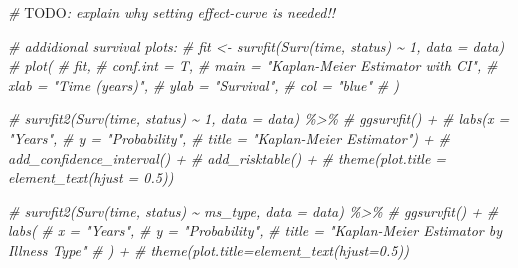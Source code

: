\documentclass[
]{article}
\newenvironment{Shaded}{\begin{snugshade}}{\end{snugshade}}
\newcommand{\AlertTok}[1]{\textcolor[rgb]{0.94,0.16,0.16}{#1}}
\newcommand{\CommentTok}[1]{\textcolor[rgb]{0.56,0.35,0.01}{\textit{#1}}}
\begin{document}
\begin{Shaded}
\begin{Highlighting}[]
\CommentTok{\# }\AlertTok{TODO}\CommentTok{: explain why setting effect{-}curve is needed!!}
\end{Highlighting}
\end{Shaded}

\begin{Shaded}
\begin{Highlighting}[]
\CommentTok{\# addidional survival plots:}
\CommentTok{\# fit \textless{}{-} survfit(Surv(time, status) \textasciitilde{} 1, data = data)}
\CommentTok{\# plot(}
\CommentTok{\#   fit,}
\CommentTok{\#   conf.int = T,}
\CommentTok{\#   main = "Kaplan{-}Meier Estimator with CI",}
\CommentTok{\#   xlab = "Time (years)",}
\CommentTok{\#   ylab = "Survival",}
\CommentTok{\#   col = "blue"}
\CommentTok{\# )}

\CommentTok{\# survfit2(Surv(time, status) \textasciitilde{} 1, data = data) \%\textgreater{}\%}
\CommentTok{\#   ggsurvfit() +}
\CommentTok{\#   labs(x = "Years",}
\CommentTok{\#        y = "Probability",}
\CommentTok{\#        title = "Kaplan{-}Meier Estimator") +}
\CommentTok{\#   add\_confidence\_interval() +}
\CommentTok{\#   add\_risktable() +}
\CommentTok{\#   theme(plot.title = element\_text(hjust = 0.5))}


\CommentTok{\# survfit2(Surv(time, status) \textasciitilde{} ms\_type, data = data) \%\textgreater{}\%}
\CommentTok{\#   ggsurvfit() +}
\CommentTok{\#   labs(}
\CommentTok{\#     x = "Years",}
\CommentTok{\#     y = "Probability",}
\CommentTok{\#     title = "Kaplan{-}Meier Estimator by Illness Type"}
\CommentTok{\#     ) +}
\CommentTok{\#   theme(plot.title=element\_text(hjust=0.5))}
\end{Highlighting}
\end{Shaded}
\end{document}
